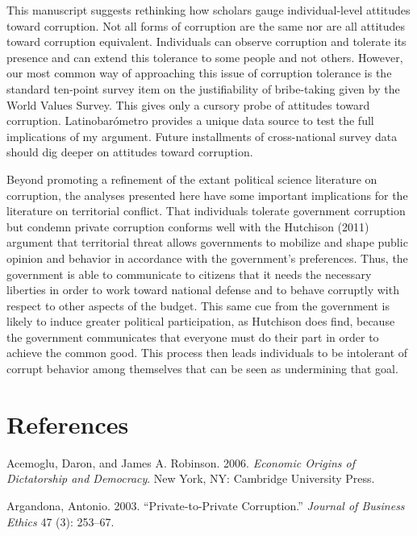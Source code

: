 \documentclass[11pt,]{article}
\begin{document}
This manuscript suggests rethinking how scholars gauge individual-level
attitudes toward corruption. Not all forms of corruption are the same
nor are all attitudes toward corruption equivalent. Individuals can
observe corruption and tolerate its presence and can extend this
tolerance to some people and not others. However, our most common way of
approaching this issue of corruption tolerance is the standard ten-point
survey item on the justifiability of bribe-taking given by the World
Values Survey. This gives only a cursory probe of attitudes toward
corruption. Latinobarómetro provides a unique data source to test the
full implications of my argument. Future installments of cross-national
survey data should dig deeper on attitudes toward corruption.

Beyond promoting a refinement of the extant political science literature
on corruption, the analyses presented here have some important
implications for the literature on territorial conflict. That
individuals tolerate government corruption but condemn private
corruption conforms well with the Hutchison (2011) argument that
territorial threat allows governments to mobilize and shape public
opinion and behavior in accordance with the government's preferences.
Thus, the government is able to communicate to citizens that it needs
the necessary liberties in order to work toward national defense and to
behave corruptly with respect to other aspects of the budget. This same
cue from the government is likely to induce greater political
participation, as Hutchison does find, because the government
communicates that everyone must do their part in order to achieve the
common good. This process then leads individuals to be intolerant of
corrupt behavior among themselves that can be seen as undermining that
goal.

\section{References}\label{references}

\setlength{\parindent}{-0.2in} \setlength{\leftskip}{0.2in}
\setlength{\parskip}{8pt} \vspace*{-0.2in} \noindent

\hypertarget{refs}{}
\hypertarget{ref-acemoglurobinson2006eodd}{}
Acemoglu, Daron, and James A. Robinson. 2006. \emph{Economic Origins of
Dictatorship and Democracy}. New York, NY: Cambridge University Press.

\hypertarget{ref-argandona2003ppc}{}
Argandona, Antonio. 2003. ``Private-to-Private Corruption.''
\emph{Journal of Business Ethics} 47 (3): 253--67.
\end{document}
